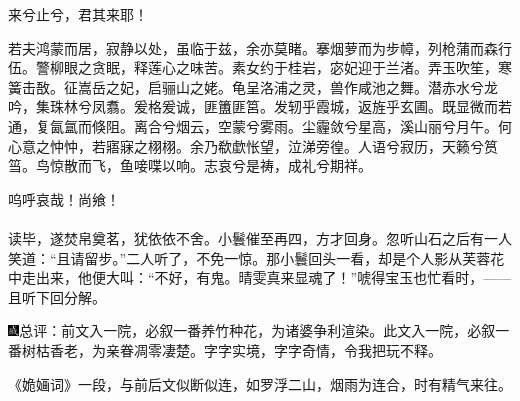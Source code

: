 来兮止兮，君其来耶！

若夫鸿蒙而居，寂静以处，虽临于兹，余亦莫睹。搴烟萝而为步幛，列枪蒲而森行伍。警柳眼之贪眠，释莲心之味苦。素女约于桂岩，宓妃迎于兰渚。弄玉吹笙，寒簧击敔。征嵩岳之妃，启骊山之姥。龟呈洛浦之灵，兽作咸池之舞。潜赤水兮龙吟，集珠林兮凤翥。爰格爰诚，匪簠匪筥。发轫乎霞城，返旌乎玄圃。既显微而若通，复氤氲而倏阻。离合兮烟云，空蒙兮雾雨。尘霾敛兮星高，溪山丽兮月午。何心意之忡忡，若寤寐之栩栩。余乃欷歔怅望，泣涕旁徨。人语兮寂历，天籁兮筼筜。鸟惊散而飞，鱼唼喋以响。志哀兮是祷，成礼兮期祥。

呜呼哀哉！尚飨！
\\
\\
\indent
读毕，遂焚帛奠茗，犹依依不舍。小鬟催至再四，方才回身。忽听山石之后有一人笑道：“且请留步。”二人听了，不免一惊。那小鬟回头一看，却是个人影从芙蓉花中走出来，他便大叫：“不好，有鬼。晴雯真来显魂了！”唬得宝玉也忙看时，------且听下回分解。

{\includegraphics[width=3mm]{../Images/00005}\kaishu 总评：前文入一院，必叙一番养竹种花，为诸婆争利渲染。此文入一院，必叙一番树枯香老，为亲眷凋零凄楚。字字实境，字字奇情，令我把玩不释。}

{\kaishu 《姽婳词》一段，与前后文似断似连，如罗浮二山，烟雨为连合，时有精气来往。}